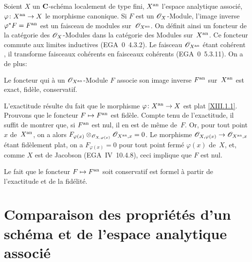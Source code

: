 \subsection{}
\label{XII.1.3}
Soient $X$ un $\mathbf{C}$-sch\'ema localement de type fini, $X^{\mathrm{an}}$
l'espace analytique associ\'e, $\varphi\colon X^{\an}\to X$ le
morphisme canonique. Si $F$ est un ${\cal{O}}_X$-Module, l'image
inverse $\varphi^*F=F^{\mathrm{an}}$ est un faisceau de modules sur~${\cal{O}}_{X^{\an}}$. On d\'efinit ainsi un foncteur de la
cat\'egorie des $\cal{O}_X$-Modules dans la cat\'egorie des
Modules sur~$X^{\mathrm{an}}$. Ce foncteur commute aux limites inductives
(EGA~0~4.3.2). Le faisceau $\cal{O}_{X^{\an}}$ \'etant coh\'erent
\cite[~\S 2~th.\, 2]{XII.4}, il transforme faisceaux coh\'erents en
faisceaux coh\'erents (EGA~0~5.3.11). On a de plus:

\begin{subproposition}
\label{XII.1.3.1}
Le foncteur qui \`a un $\cal{O}_{X^{\an}}$-Module $F$ associe son
image inverse $F^{\mathrm{an}}$ sur~$X^{\mathrm{an}}$ est exact, fid\`ele,
conservatif.
\end{subproposition}

L'exactitude r\'esulte du fait que le morphisme $\varphi\colon
X^{\an}\to X$ est plat \eqref{XIII.1.1}. Prouvons que le foncteur $F\mto
F^{\an}$ est fid\`ele. Compte tenu de l'exactitude, il suffit de
montrer que, si $F^{\mathrm{an}}$ est nul, il en est de m\^eme de~$F$. Or,
pour tout point $x$ de~$X^{\mathrm{an}}$, on a alors $F_{\varphi
(x)}\otimes_{\cal{O}_{X,\varphi (x)}}\cal{O}_{X^{\an},x}=0$. Le
morphisme $\cal{O}_{X,\varphi (x)}\to \cal{O}_{X^{\an},x}$ \'etant
fid\`element plat, on a $F_{\varphi (x)}=0$ pour tout point
ferm\'e $\varphi (x)$ de~$X$, et, comme $X$ est de Jacobson
(EGA~IV~10.4.8), ceci implique que $F$ est nul.

Le
fait que le foncteur $F\mto F^{\an}$ soit conservatif est formel
\`a partir de l'exactitude et de la fid\'elit\'e.

\section[Comparaison des propri\'et\'es d'un sch\'ema]{Comparaison des propri\'et\'es d'un sch\'ema et de l'espace
analytique \hbox{associé}}
\label{XII.2}

